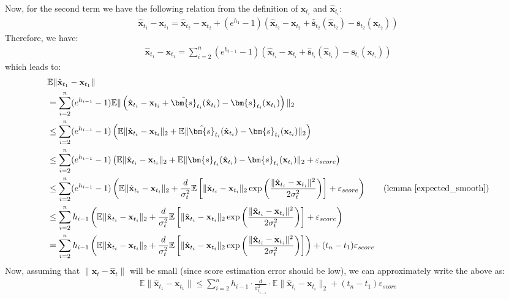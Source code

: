 \documentclass[11pt]{article}
\def\rvx{{\mathbf{x}}}
\def\vs{{\bm{s}}}
\begin{document}
\vspace{0.1in}
Now, for the second term we have the following relation from the definition of $\rvx_{t_i}$ and $\hat{\rvx}_{t_i}$:
\begin{align*}
    \hat{\rvx}_{t_1} - \rvx_{t_1}  = \hat{\rvx}_{t_2} - \rvx_{t_2} + (e^{h_1}-1)\left(\hat{\rvx}_{t_2} - \rvx_{t_2} + \hat{\vs}_{t_2}(\hat{\rvx}_{t_2})-{\vs}_{t_2}({\rvx}_{t_2})\right) 
\end{align*}
Therefore, we have:
\begin{align*}
    \hat{\rvx}_{t_1} - \rvx_{t_1} = \sum_{i=2}^n(e^{h_{i-1}}-1)\left(\hat{\rvx}_{t_i} - \rvx_{t_i} + \hat{\vs}_{t_i}(\hat{\rvx}_{t_i})-{\vs}_{t_i}({\rvx}_{t_i})\right) 
\end{align*}
which leads to:
\begin{align*}
    &\mathbb{E}\|\hat{\rvx}_{t_1} - \rvx_{t_1}\|\\
    &= \sum_{i=2}^n(e^{h_{i-1}}-1)\mathbb{E}\|\left(\hat{\rvx}_{t_i} - \rvx_{t_i} + \hat{\vs}_{t_i}(\hat{\rvx}_{t_i})-{\vs}_{t_i}({\rvx}_{t_i})\right)\|_2 \\
    &\leq \sum_{i=2}^n(e^{h_{i-1}}-1)\left(\mathbb{E}\|\hat{\rvx}_{t_i} - \rvx_{t_i}\|_2 + \mathbb{E}\| \hat{\vs}_{t_i}(\hat{\rvx}_{t_i})-{\vs}_{t_i}({\rvx}_{t_i})\|_2 \right)\\
    &\leq \sum_{i=2}^n(e^{h_{i-1}}-1)\left(\mathbb{E}\|\hat{\rvx}_{t_i} - \rvx_{t_i}\|_2 + \mathbb{E}\| {\vs}_{t_i}(\hat{\rvx}_{t_i})-{\vs}_{t_i}({\rvx}_{t_i})\|_2 + \varepsilon_{score}\right)\\
    &\leq \sum_{i=2}^n(e^{h_{i-1}}-1)\left(\mathbb{E}\|\hat{\rvx}_{t_i} - \rvx_{t_i}\|_2 + \frac{d}{\sigma_t^2}\mathbb{E}\left[\| \hat{\rvx}_{t_i} - \rvx_{t_i}\|_2 \exp\left(\frac{\|\hat{\rvx}_{t_i} - \rvx_{t_i}\|^2}{2\sigma_t^2}\right) \right]+\varepsilon_{score}\right) \qquad \text{(lemma \ref{expected_smooth})} \\
   & \leq \sum_{i=2}^nh_{i-1}\left(\mathbb{E}\|\hat{\rvx}_{t_i} - \rvx_{t_i}\|_2 + \frac{d}{\sigma_t^2}\mathbb{E}\left[\| \hat{\rvx}_{t_i} - \rvx_{t_i}\|_2 \exp\left(\frac{\|\hat{\rvx}_{t_i} - \rvx_{t_i}\|^2}{2\sigma_t^2}\right) \right]+\varepsilon_{score}\right)  \\
   & = \sum_{i=2}^nh_{i-1}\left(\mathbb{E}\|\hat{\rvx}_{t_i} - \rvx_{t_i}\|_2 + \frac{d}{\sigma_t^2}\mathbb{E}\left[\| \hat{\rvx}_{t_i} - \rvx_{t_i}\|_2 \exp\left(\frac{\|\hat{\rvx}_{t_i} - \rvx_{t_i}\|^2}{2\sigma_t^2}\right) \right]\right) + (t_n-t_1)\varepsilon_{score} \\
\end{align*}
Now, assuming that $\|\rvx_t-\hat{\rvx}_t\|$ will be small (since score estimation error should be low), we can approximately write the above as:
\begin{align*}
     \mathbb{E}\|\hat{\rvx}_{t_1} - \rvx_{t_1}\| \leq \sum_{i=2}^nh_{i-1}\cdot \frac{d}{\sigma_{t_{i-1}}^2} \cdot  \mathbb{E}\|\hat{\rvx}_{t_i} - \rvx_{t_i}\|_2 + (t_n-t_1)\varepsilon_{score}
\end{align*}
\end{document}
